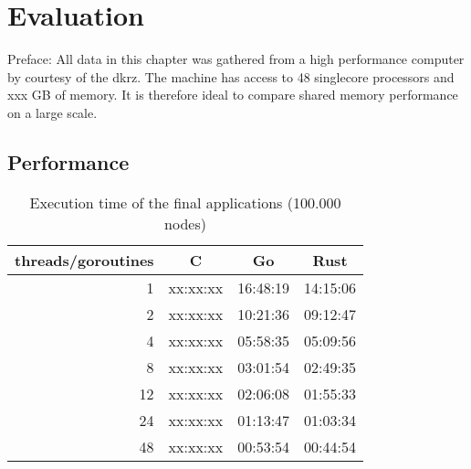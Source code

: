 \chapter{Evaluation}
\label{ch:Evaluation}


Preface: All data in this chapter was gathered from a high performance computer by courtesy of the \gls{dkrz}. The machine has access to 48 singlecore processors and xxx GB of memory. It is therefore ideal to compare shared memory performance on a large scale.

\section{Performance}
\label{sec:Evaluaton::Performance}

\begin{table}[htb]
    \centering
    \begin{tabular}{rccc}
        \toprule
            threads/goroutines
            & C
            & Go
            & Rust \\
        \midrule

            1
            & xx:xx:xx
            & 16:48:19
            & 14:15:06 \\

            2
            & xx:xx:xx
            & 10:21:36
            & 09:12:47 \\

            4
            & xx:xx:xx
            & 05:58:35
            & 05:09:56 \\

            8
            & xx:xx:xx
            & 03:01:54
            & 02:49:35 \\

            12
            & xx:xx:xx
            & 02:06:08
            & 01:55:33 \\

            24
            & xx:xx:xx
            & 01:13:47
            & 01:03:34 \\

            48
            & xx:xx:xx
            & 00:53:54
            & 00:44:54 \\

        \bottomrule
    \end{tabular}
    \caption{Execution time of the final applications (100.000 nodes)}
    \label{tb:final_execution_time}
\end{table}

